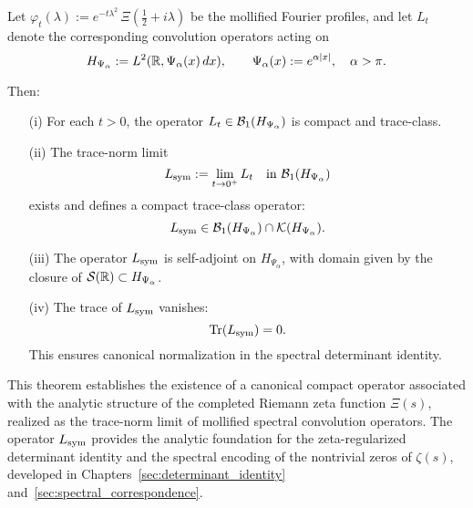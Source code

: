 \begin{theorem}
\label{thm:existence_Lsym}
Let \( \varphi_t(\lambda) := e^{-t\lambda^2} \, \Xi\left( \tfrac{1}{2} + i\lambda \right) \) be the mollified Fourier profiles, and let \( L_t \) denote the corresponding convolution operators acting on
\[
H_{\Psi_\alpha} := L^2(\mathbb{R}, \Psi_\alpha(x)\, dx), \qquad \Psi_\alpha(x) := e^{\alpha |x|}, \quad \alpha > \pi.
\]

Then:
\begin{enumerate}
  \item[\textnormal{(i)}] For each \( t > 0 \), the operator \( L_t \in \mathcal{B}_1(H_{\Psi_\alpha}) \) is compact and trace-class.

  \item[\textnormal{(ii)}] The trace-norm limit
  \[
  L_{\mathrm{sym}} := \lim_{t \to 0^+} L_t \quad \text{in } \mathcal{B}_1(H_{\Psi_\alpha})
  \]
  exists and defines a compact trace-class operator:
  \[
  L_{\mathrm{sym}} \in \mathcal{B}_1(H_{\Psi_\alpha}) \cap \mathcal{K}(H_{\Psi_\alpha}).
  \]

  \item[\textnormal{(iii)}] The operator \( L_{\mathrm{sym}} \) is self-adjoint on \( H_{\Psi_\alpha} \), with domain given by the closure of \( \mathcal{S}(\mathbb{R}) \subset H_{\Psi_\alpha} \).

  \item[\textnormal{(iv)}] The trace of \( L_{\mathrm{sym}} \) vanishes:
  \[
  \operatorname{Tr}(L_{\mathrm{sym}}) = 0.
  \]
  This ensures canonical normalization in the spectral determinant identity.
\end{enumerate}

\medskip
\noindent
This theorem establishes the existence of a canonical compact operator associated with the analytic structure of the completed Riemann zeta function \( \Xi(s) \), realized as the trace-norm limit of mollified spectral convolution operators. The operator \( L_{\mathrm{sym}} \) provides the analytic foundation for the zeta-regularized determinant identity and the spectral encoding of the nontrivial zeros of \( \zeta(s) \), developed in Chapters~\ref{sec:determinant_identity} and~\ref{sec:spectral_correspondence}.
\end{theorem}
